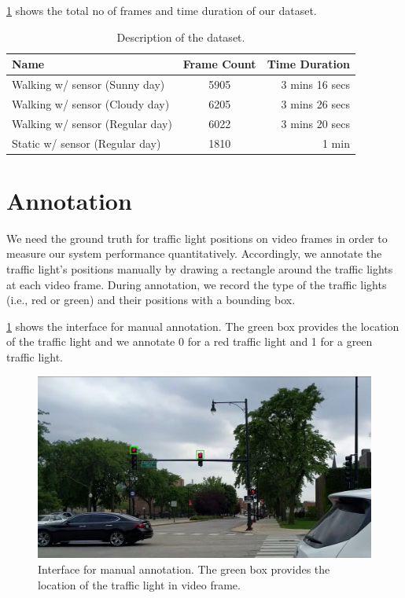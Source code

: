 \ref{t:dataset} shows the total no of frames and time duration of our dataset.

\begin{table}[h!]
  \centering
  \caption{Description of the dataset.}
  \label{t:dataset}
  \begin{tabular}{  l  c  r  }
    \rowcolor{gray!50}
    Name & Frame Count & Time Duration \\
    \hline
    Walking w/ sensor (Sunny day) & 5905 & 3 mins 16 secs  \\
    Walking w/ sensor (Cloudy day) & 6205 & 3 mins 26 secs \\
    Walking w/ sensor (Regular day) & 6022 & 3 mins 20 secs \\
    Static w/ sensor (Regular day) & 1810 & 1 min \\
    \hline
  \end{tabular}
\end{table}

\section{Annotation}
We need the ground truth for traffic light positions on video frames in order to measure our system performance quantitatively.
Accordingly, we annotate the traffic light's positions manually by drawing a rectangle around the traffic lights at each video frame.
During annotation, we record the type of the traffic lights (i.e., red or green) and their positions with a bounding box.

\ref{f:annotate} shows the interface for manual annotation.
The green box provides the location of the traffic light and we annotate 0 for a red traffic light and 1 for a green traffic light.

\begin{figure}[h!]
\centering
\includegraphics[width=5.2in]{images/annotation.png}
\caption{Interface for manual annotation. The green box provides the location of the traffic light in video frame.}
\label{f:annotate}
\end{figure}


